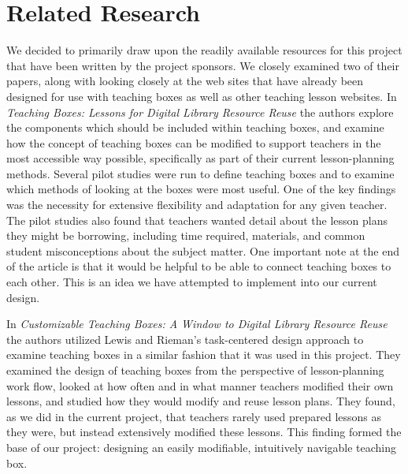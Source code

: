 \documentclass[10pt,letter]{article}
\begin{document}
\section{Related Research}
We decided to primarily draw upon the readily available resources for this
project that have been written by the project sponsors.  We closely examined two
of their papers, along with looking closely at the web sites that have already
been designed for use with teaching boxes as well as other teaching lesson
websites.  In \textit{Teaching Boxes: Lessons for Digital Library Resource
Reuse} \cite{bib:khan-maull} the authors explore the components which should be
included within teaching boxes, and examine how the concept of teaching boxes
can be modified to support teachers in the most accessible way possible,
specifically as part of their current lesson-planning methods.  Several pilot
studies were run to define teaching boxes and to examine which methods of
looking at the boxes were most useful.  One of the key findings was the
necessity for extensive flexibility and adaptation for any given teacher.  The
pilot studies also found that teachers wanted detail about the lesson plans they
might be borrowing, including time required, materials, and common student
misconceptions about the subject matter.  One important note at the end of the
article is that it would be helpful to be able to connect teaching boxes to each
other.  This is an idea we have attempted to implement into our current design.

In \textit{Customizable Teaching Boxes: A Window to Digital Library Resource
Reuse} \cite{bib:khan-maull2} the authors utilized Lewis and Rieman's
task-centered design approach to examine teaching boxes in a similar fashion
that it was used in this project.  They examined the design of teaching boxes
from the perspective of lesson-planning work flow, looked at how often and in
what manner teachers modified their own lessons, and studied how they would
modify and reuse lesson plans.  They found, as we did in the current project,
that teachers rarely used prepared lessons as they were, but instead extensively
modified these lessons.  This finding formed the base of our project: designing
an easily modifiable, intuitively navigable teaching box.
\end{document}
